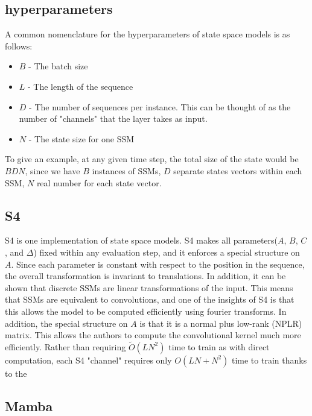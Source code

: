 \subsection{hyperparameters}
A common nomenclature for the hyperparameters of state space models is as
follows:
\begin{itemize}
    \item $B$ - The batch size
    \item $L$ - The length of the sequence
    \item $D$ - The number of sequences per instance. This can be thought of as
    the number of "channels" that the layer takes as input.
    \item $N$ - The state size for one SSM
\end{itemize}
To give an example, at any given time step, the total size of the state would be
$BDN$, since we have $B$ instances of SSMs, $D$ separate states vectors within
each SSM, $N$ real number for each state vector.

\subsection{S4}
S4\cite{gu2022efficiently} is one implementation of state space models.
S4 makes all parameters($A$, $B$, $C$, and $\Delta$) fixed within any evaluation
step, and it enforces a special structure on $A$.
Since each parameter is constant with respect to the position in the sequence,
the overall transformation is invariant to translations.
In addition, it can be shown that discrete SSMs are linear transformations of
the input.
This means that SSMs are equivalent to convolutions, and one of the insights of
S4 is that this allows the model to be computed efficiently using fourier
transforms.
In addition, the special structure on $A$ is that it is a normal plus low-rank
(NPLR) matrix. This allows the authors to compute the convolutional kernel much
more efficiently.
Rather than requiring $\tilde O(LN^2)$ time to train as with direct computation,
each S4 "channel" requires only $O(LN + N^2)$ time to train thanks to the
\subsection{Mamba}

